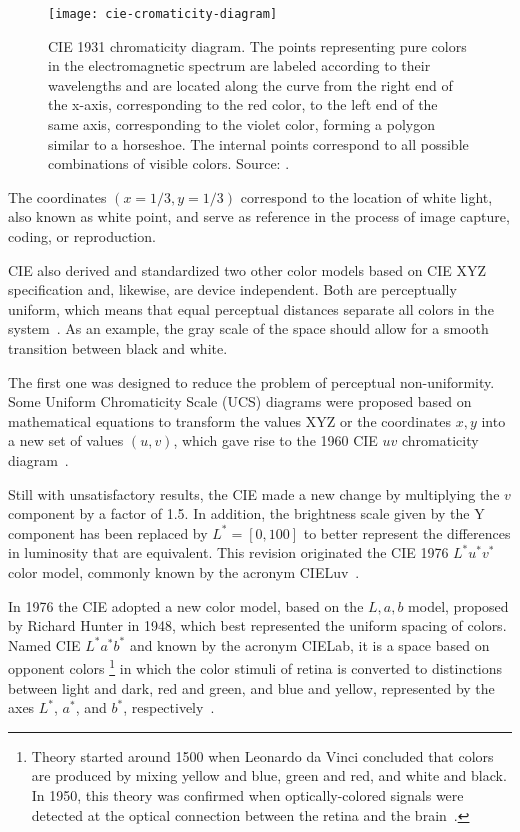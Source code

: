 \begin{figure}[!ht]
  \centering
  \texttt{[image: cie-cromaticity-diagram]}
  \caption[CIE 1931 chromaticity diagram]{CIE 1931 chromaticity diagram. The points representing pure colors in the electromagnetic spectrum are labeled according to their wavelengths and are located along the curve from the right end of the x-axis, corresponding to the red color, to the left end of the same axis, corresponding to the violet color, forming a polygon similar to a horseshoe. The internal points correspond to all possible combinations of visible colors. Source: \citet{ben:09}.}
  \label{fig:cie-cromaticity-diagram} 
\end{figure}

The coordinates $ (x = 1/3, y = 1/3) $ correspond to the location of white light, also known as white point, and serve as reference in the process of image capture, coding, or reproduction.

CIE also derived and standardized two other color models based on CIE XYZ specification and, likewise, are device independent. Both are perceptually uniform, which means that equal perceptual distances separate all colors in the system~\citep{vezhnevets:03}. As an example, the gray scale of the space should allow for a smooth transition between black and white.

The first one was designed to reduce the problem of perceptual non-uniformity. Some Uniform Chromaticity Scale (UCS) diagrams were proposed based on mathematical equations to transform the values XYZ or the coordinates $x, y$ into a new set of values $(u, v)$, which gave rise to the 1960 CIE $uv$ chromaticity diagram~\citep{gevers:12}.

Still with unsatisfactory results, the CIE made a new change by multiplying the $v$ component by a factor of 1.5. In addition, the brightness scale given by the Y component has been replaced by $L^* = [0, 100]$ to better represent the differences in luminosity that are equivalent. This revision originated the CIE 1976 $L^*u^*v^*$ color model, commonly known by the acronym CIELuv~\citep{gevers:12}.

In 1976 the CIE adopted a new color model, based on the $L, a, b$ model, proposed by Richard Hunter in 1948, which best represented the uniform spacing of colors. Named CIE $L^*a^*b^*$ and known by the acronym CIELab, it is a space based on opponent colors \footnote{Theory started around 1500 when Leonardo da Vinci concluded that colors are produced by mixing yellow and blue, green and red, and white and black. In 1950, this theory was confirmed when optically-colored signals were detected at the optical connection between the retina and the brain~\citep{gevers:12}.} in which the color stimuli of retina is converted to distinctions between light and dark, red and green, and blue and yellow, represented by the axes $L^*$, $a^*$, and $b^*$, respectively~\citep{gevers:12}.


